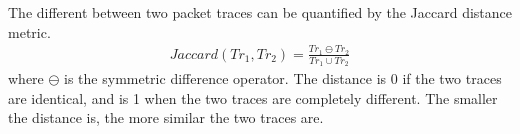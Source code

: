 The different between two packet traces can be quantified by the Jaccard distance
metric.%
\begin{align}
  Jaccard(Tr_1, Tr_2) = \frac{Tr_1 \ominus Tr_2}{Tr_1 \cup Tr_2}
\end{align}%
where $\ominus$ is the symmetric difference operator.
The distance is 0 if the
two traces are identical, and is 1 when the two traces are completely different.
The smaller the distance is, the more similar the two traces are.

